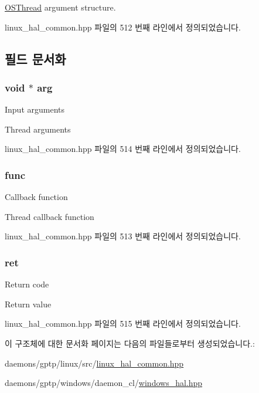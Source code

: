\hyperlink{class_o_s_thread}{O\+S\+Thread} argument structure. 

linux\+\_\+hal\+\_\+common.\+hpp 파일의 512 번째 라인에서 정의되었습니다.



\subsection{필드 문서화}
\subsubsection[{\texorpdfstring{arg}{arg}}]{\setlength{\rightskip}{0pt plus 5cm}void $\ast$ arg}\hypertarget{struct_o_s_thread_arg_ae036856e415526e58e249638733f6752}{}\label{struct_o_s_thread_arg_ae036856e415526e58e249638733f6752}
Input arguments

Thread arguments 

linux\+\_\+hal\+\_\+common.\+hpp 파일의 514 번째 라인에서 정의되었습니다.

\subsubsection[{\texorpdfstring{func}{func}}]{ func}\hypertarget{struct_o_s_thread_arg_a8eac03f92af0136b0d3570a5fd522d0b}{}\label{struct_o_s_thread_arg_a8eac03f92af0136b0d3570a5fd522d0b}
Callback function

Thread callback function 

linux\+\_\+hal\+\_\+common.\+hpp 파일의 513 번째 라인에서 정의되었습니다.

\subsubsection[{\texorpdfstring{ret}{ret}}]{ ret}\hypertarget{struct_o_s_thread_arg_a30d995ac745fe161ad76f8bb0dacad37}{}\label{struct_o_s_thread_arg_a30d995ac745fe161ad76f8bb0dacad37}
Return code

Return value 

linux\+\_\+hal\+\_\+common.\+hpp 파일의 515 번째 라인에서 정의되었습니다.



이 구조체에 대한 문서화 페이지는 다음의 파일들로부터 생성되었습니다.\+:\begin{DoxyCompactItemize}
\item 
daemons/gptp/linux/src/\hyperlink{linux__hal__common_8hpp}{linux\+\_\+hal\+\_\+common.\+hpp}\item 
daemons/gptp/windows/daemon\+\_\+cl/\hyperlink{windows__hal_8hpp}{windows\+\_\+hal.\+hpp}\end{DoxyCompactItemize}
